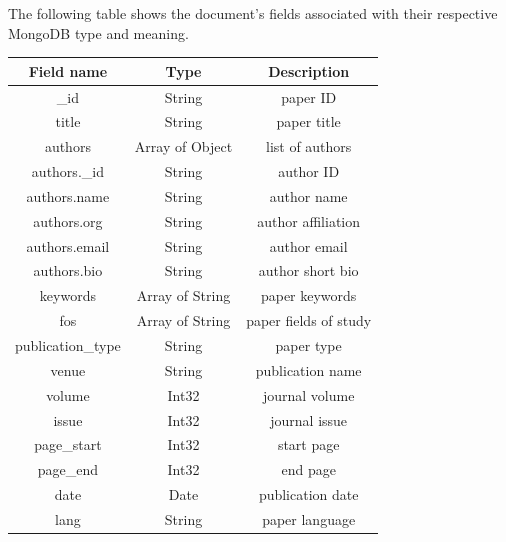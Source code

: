 The following table shows the document's fields associated with their respective MongoDB type and meaning.
\begin{table}[H]
    \centering
    \begin{tabular}{| c | c | c |}
        \hline %
        \textbf{Field name}      & \textbf{Type}   & \textbf{Description} \T\B \\
        \hline \hline
        \_id                     & String          & paper ID\T\B              \\
        title                    & String          & paper title\T\B           \\
        authors                  & Array of Object & list of authors\T\B       \\
        authors.\_id             & String          & author ID\T\B             \\
        authors.name             & String          & author name\T\B           \\
        authors.org              & String          & author affiliation\T\B    \\
        authors.email            & String          & author email\T\B          \\
        authors.bio              & String          & author short bio\T\B      \\
        keywords                 & Array of String & paper keywords\T\B        \\
        fos                      & Array of String & paper fields of study\T\B \\
        publication\_type        & String          & paper type\T\B            \\
        venue                    & String          & publication name\T\B      \\
        volume                   & Int32           & journal volume\T\B        \\
        issue                    & Int32           & journal issue\T\B         \\
        page\_start              & Int32           & start page\T\B            \\
        page\_end                & Int32           & end page\T\B              \\
        date                     & Date            & publication date\T\B      \\
        lang                     & String          & paper language\T\B        \\

\end{tabular}
\end{table}
